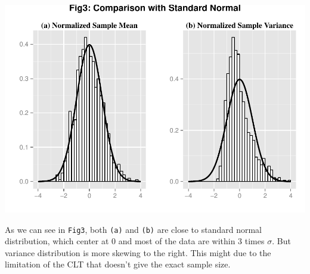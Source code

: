 \documentclass[]{article}
\begin{document}
\includegraphics{PA1pdf_files/figure-latex/unnamed-chunk-7-1.pdf}

As we can see in \texttt{Fig3}, both \texttt{(a)} and \texttt{(b)} are
close to standard normal distribution, which center at 0 and most of the
data are within 3 times \(\sigma\). But variance distribution is more
skewing to the right. This might due to the limitation of the CLT that
doesn't give the exact sample size.
\end{document}
